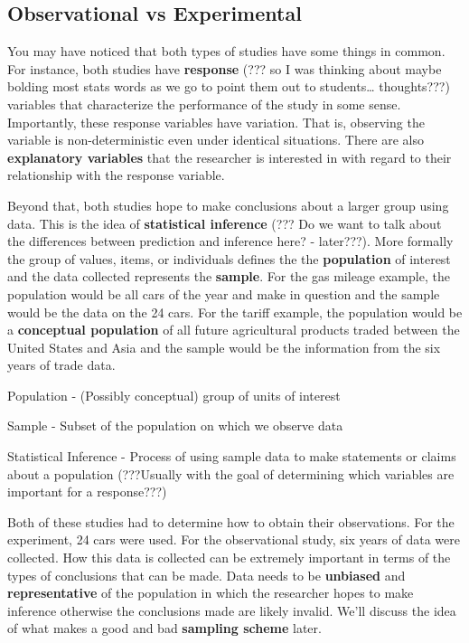 \documentclass[
]{book}
\theoremstyle{definition}
\theoremstyle{definition}
\theoremstyle{definition}
\theoremstyle{remark}
\let\BeginKnitrBlock\begin \let\EndKnitrBlock\end
\begin{document}
\hypertarget{observational-vs-experimental}{%
\subsection{Observational vs Experimental}\label{observational-vs-experimental}}

You may have noticed that both types of studies have some things in common. For instance, both studies have \textbf{response} (??? so I was thinking about maybe bolding most stats words as we go to point them out to students\ldots{} thoughts???) variables that characterize the performance of the study in some sense. Importantly, these response variables have variation. That is, observing the variable is non-deterministic even under identical situations. There are also \textbf{explanatory variables} that the researcher is interested in with regard to their relationship with the response variable.

Beyond that, both studies hope to make conclusions about a larger group using data. This is the idea of \textbf{statistical inference} (??? Do we want to talk about the differences between prediction and inference here? - later???). More formally the group of values, items, or individuals defines the the \textbf{population} of interest and the data collected represents the \textbf{sample}. For the gas mileage example, the population would be all cars of the year and make in question and the sample would be the data on the 24 cars. For the tariff example, the population would be a \textbf{conceptual population} of all future agricultural products traded between the United States and Asia and the sample would be the information from the six years of trade data.

\BeginKnitrBlock{definition}
Population - (Possibly conceptual) group of units of interest
\EndKnitrBlock{definition}

\BeginKnitrBlock{definition}
Sample - Subset of the population on which we observe data
\EndKnitrBlock{definition}

\BeginKnitrBlock{definition}
Statistical Inference - Process of using sample data to make statements or claims about a population (???Usually with the goal of determining which variables are important for a response???)
\EndKnitrBlock{definition}

Both of these studies had to determine how to obtain their observations. For the experiment, 24 cars were used. For the observational study, six years of data were collected. How this data is collected can be extremely important in terms of the types of conclusions that can be made. Data needs to be \textbf{unbiased} and \textbf{representative} of the population in which the researcher hopes to make inference otherwise the conclusions made are likely invalid. We'll discuss the idea of what makes a good and bad \textbf{sampling scheme} later.
\end{document}
